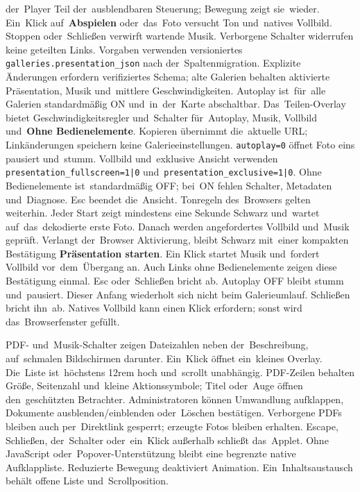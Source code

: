 \documentclass[11pt,a4paper]{article}
\newcommand{\ui}[1]{\textbf{#1}}
\newcommand{\codeword}[1]{\nolinkurl{#1}}
\begin{document}
der~Player Teil der~ausblendbaren Steuerung; Bewegung zeigt sie~wieder.
Ein~Klick auf~\ui{Abspielen} oder~das~Foto versucht Ton und~natives Vollbild.
Stoppen oder~Schließen verwirft wartende Musik. Verborgene Schalter widerrufen
keine geteilten Links.
Vorgaben verwenden versioniertes \codeword{galleries.presentation_json} nach
der~Spaltenmigration. Explizite Änderungen erfordern verifiziertes Schema;
alte Galerien behalten aktivierte Präsentation, Musik und~mittlere
Geschwindigkeiten.
Autoplay ist~für~alle Galerien standardmäßig ON und~in~der~Karte abschaltbar.
Das~Teilen-Overlay bietet Geschwindigkeitsregler und~Schalter für~Autoplay,
Musik, Vollbild und~\ui{Ohne Bedienelemente}. Kopieren übernimmt die~aktuelle
URL;
Linkänderungen speichern keine Galerieeinstellungen.
\codeword{autoplay=0} öffnet Foto eins pausiert und~stumm. Vollbild
und~exklusive
Ansicht verwenden \codeword{presentation_fullscreen=1|0}
und~\codeword{presentation_exclusive=1|0}.
Ohne Bedienelemente ist~standardmäßig OFF; bei~ON fehlen Schalter, Metadaten
und~Diagnose. Esc beendet die~Ansicht. Tonregeln des~Browsers gelten weiterhin.
Jeder Start zeigt mindestens eine Sekunde Schwarz und~wartet auf~das~dekodierte
erste Foto. Danach werden angefordertes Vollbild und~Musik geprüft.
Verlangt der~Browser Aktivierung, bleibt Schwarz mit~einer kompakten
Bestätigung \ui{Präsentation starten}. Ein Klick startet Musik und~fordert
Vollbild vor~dem~Übergang an. Auch Links ohne Bedienelemente zeigen diese
Bestätigung einmal. Esc oder~Schließen bricht ab. Autoplay OFF bleibt stumm
und~pausiert.
Dieser Anfang wiederholt sich nicht beim Galerieumlauf. Schließen bricht ihn~ab.
Natives Vollbild kann einen Klick erfordern; sonst wird das~Browserfenster
gefüllt.

PDF- und~Musik-Schalter zeigen Dateizahlen neben der~Beschreibung,
auf~schmalen Bildschirmen darunter. Ein~Klick öffnet ein~kleines Overlay.
Die~Liste ist~höchstens 12rem hoch und~scrollt unabhängig. PDF-Zeilen
behalten Größe, Seitenzahl und~kleine Aktionssymbole; Titel oder~Auge
öffnen den~geschützten Betrachter. Administratoren können Umwandlung
aufklappen, Dokumente ausblenden/einblenden oder~Löschen bestätigen.
Verborgene PDFs bleiben auch per~Direktlink gesperrt; erzeugte Fotos
bleiben erhalten. Escape, Schließen, der~Schalter oder~ein~Klick außerhalb
schließt das~Applet. Ohne JavaScript oder~Popover-Unterstützung bleibt
eine begrenzte native Aufklappliste. Reduzierte Bewegung deaktiviert
Animation. Ein~Inhaltsaustausch behält offene Liste und~Scrollposition.
\end{document}
